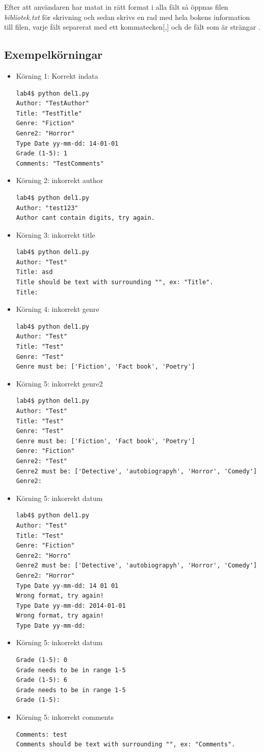 \documentclass[11pt, titlepage, oneside, a4paper]{article}
\newcommand{\Subsection}[1]{\vspace{-4pt}\subsection{#1}\vspace{-8pt}}
\begin{document}
		Efter att användaren har matat in rätt format i alla fält så öppnas filen \emph{bibliotek.txt} för skrivning och sedan skrivs en rad 
		med hela bokens information till filen, varje fält separerat med ett kommatecken[\emph{,}] och de fält som är strängar . 
		\Subsection{Exempelkörningar}
		\begin{itemize}
		 \item Körning 1: Korrekt indata
		 \subitem \begin{lstlisting}
lab4$ python del1.py 
Author: "TestAuthor"
Title: "TestTitle"
Genre: "Fiction"
Genre2: "Horror"
Type Date yy-mm-dd: 14-01-01
Grade (1-5): 1
Comments: "TestComments"
		\end{lstlisting}
		\item Körning 2: inkorrekt author
		 \subitem \begin{lstlisting}
lab4$ python del1.py 
Author: "test123"
Author cant contain digits, try again.
		\end{lstlisting}
		\item Körning 3: inkorrekt title
		 \subitem \begin{lstlisting}
lab4$ python del1.py 
Author: "Test"
Title: asd
Title should be text with surrounding "", ex: "Title".
Title:		
\end{lstlisting}
\item Körning 4: inkorrekt genre
		 \subitem \begin{lstlisting}
lab4$ python del1.py 
Author: "Test"
Title: "Test"
Genre: "Test"
Genre must be: ['Fiction', 'Fact book', 'Poetry']
\end{lstlisting}
\item Körning 5: inkorrekt genre2
		 \subitem \begin{lstlisting}
lab4$ python del1.py 
Author: "Test"
Title: "Test"
Genre: "Test"
Genre must be: ['Fiction', 'Fact book', 'Poetry']
Genre: "Fiction"
Genre2: "Test"
Genre2 must be: ['Detective', 'autobiograpyh', 'Horror', 'Comedy']
Genre2: 
\end{lstlisting}
\item Körning 5: inkorrekt datum
		 \subitem \begin{lstlisting}
lab4$ python del1.py 
Author: "Test"
Title: "Test"
Genre: "Fiction"
Genre2: "Horro"
Genre2 must be: ['Detective', 'autobiograpyh', 'Horror', 'Comedy']
Genre2: "Horror"
Type Date yy-mm-dd: 14 01 01
Wrong format, try again!
Type Date yy-mm-dd: 2014-01-01
Wrong format, try again!
Type Date yy-mm-dd: 
\end{lstlisting}
\item Körning 5: inkorrekt datum
		 \subitem \begin{lstlisting}
Grade (1-5): 0
Grade needs to be in range 1-5
Grade (1-5): 6
Grade needs to be in range 1-5
Grade (1-5): 
\end{lstlisting}
\item Körning 5: inkorrekt comments
		 \subitem \begin{lstlisting}
Comments: test
Comments should be text with surrounding "", ex: "Comments".
\end{lstlisting}

\end{itemize}
\end{document}
